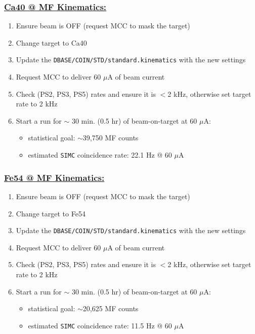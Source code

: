 \documentclass{article}
\begin{document}
\subsubsection*{\underline{Ca40 @ MF Kinematics:}}
\begin{enumerate}
\item Ensure beam is OFF (request MCC to mask the target)
\item Change target to Ca40
\item Update the \texttt{DBASE/COIN/STD/standard.kinematics} with the new settings
\item Request MCC to deliver 60 $\mu$A of beam current
\item Check (PS2, PS3, PS5) rates and ensure it is $<$2 kHz, otherwise set target rate to 2 kHz
\item Start a run for $\sim$ 30 min. (0.5 hr) of beam-on-target at 60 $\mu$A:
\begin{itemize}
    \item statistical goal: $\sim$39,750 MF counts
    \item estimated \texttt{SIMC} coincidence rate: 22.1 Hz @ 60 $\mu$A
\end{itemize}
\end{enumerate}

\subsubsection*{\underline{Fe54 @ MF Kinematics:}}
\begin{enumerate}
\item Ensure beam is OFF (request MCC to mask the target)
\item Change target to Fe54
\item Update the \texttt{DBASE/COIN/STD/standard.kinematics} with the new settings
\item Request MCC to deliver 60 $\mu$A of beam current
\item Check (PS2, PS3, PS5) rates and ensure it is $<$2 kHz, otherwise set target rate to 2 kHz
\item Start a run for $\sim$ 30 min. (0.5 hr) of beam-on-target at 60 $\mu$A:
\begin{itemize}
    \item statistical goal: $\sim$20,625 MF counts
    \item estimated \texttt{SIMC} coincidence rate: 11.5 Hz @ 60 $\mu$A
\end{itemize}
\end{enumerate}
\end{document}
